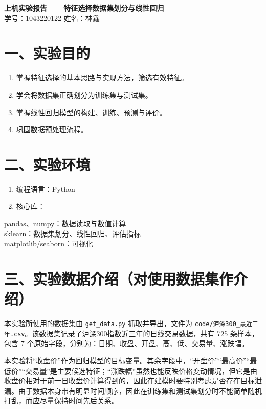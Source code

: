 \documentclass[12pt,a4paper]{ctexart}
\begin{document}
\begin{center}
{\LARGE \textbf{上机实验报告——特征选择数据集划分与线性回归}}\\[1em]
学号：1043220122 \hspace{2cm} 姓名：林鑫
\end{center}

\vspace{1em}

\section*{一、实验目的}
\begin{enumerate}[label=（\arabic*）]
\item 掌握特征选择的基本思路与实现方法，筛选有效特征。
\item 学会将数据集正确划分为训练集与测试集。
\item 掌握线性回归模型的构建、训练、预测与评价。
\item 巩固数据预处理流程。
\end{enumerate}

\section*{二、实验环境}
\begin{enumerate}[label=（\arabic*）]
\item 编程语言：Python
\item 核心库：
\end{enumerate}

\noindent pandas、numpy：数据读取与数值计算\\
\noindent sklearn：数据集划分、线性回归、评估指标\\
\noindent matplotlib/seaborn：可视化

\section*{三、实验数据介绍（对使用数据集作介绍）}
本实验所使用的数据集由 \texttt{get\_data.py} 抓取并导出，文件为 \texttt{code/沪深300\_最近三年.csv}。该数据集记录了沪深300指数近三年的日线交易数据，共有 725 条样本，包含 7 个原始字段，分别为：日期、收盘、开盘、高、低、交易量、涨跌幅。

本实验将“收盘价”作为回归模型的目标变量。其余字段中，“开盘价”“最高价”“最低价”“交易量”是主要候选特征；“涨跌幅”虽然也能反映价格变动情况，但它是由收盘价相对于前一日收盘价计算得到的，因此在建模时要特别考虑是否存在目标泄漏。由于数据本身带有明显时间顺序，因此在训练集和测试集划分时不能简单随机打乱，而应尽量保持时间先后关系。
\end{document}
